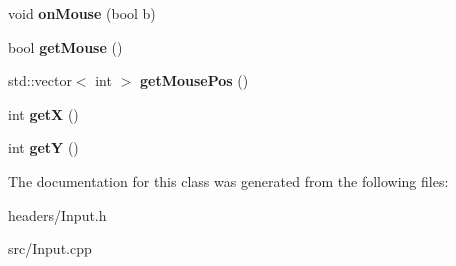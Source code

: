 \begin{DoxyCompactItemize}
void {\bfseries on\+Mouse} (bool b)
\item 
\hypertarget{class_input_a29776bdc5d13782881ab88086c545dc1}{}\label{class_input_a29776bdc5d13782881ab88086c545dc1} 
bool {\bfseries get\+Mouse} ()
\item 
\hypertarget{class_input_af42c3282eeb71f43d3f63e17e38b35c2}{}\label{class_input_af42c3282eeb71f43d3f63e17e38b35c2} 
std\+::vector$<$ int $>$ {\bfseries get\+Mouse\+Pos} ()
\item 
\hypertarget{class_input_ade14d9e3d1705a59a49310fda78d8a0e}{}\label{class_input_ade14d9e3d1705a59a49310fda78d8a0e} 
int {\bfseries getX} ()
\item 
\hypertarget{class_input_acebe8845698e31613b7e98c12600f9e3}{}\label{class_input_acebe8845698e31613b7e98c12600f9e3} 
int {\bfseries getY} ()
\end{DoxyCompactItemize}


The documentation for this class was generated from the following files\+:\begin{DoxyCompactItemize}
\item 
headers/Input.\+h\item 
src/Input.\+cpp\end{DoxyCompactItemize}
